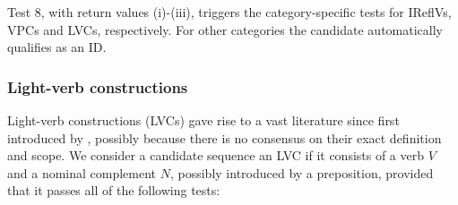 \documentclass[output=paper,
modfonts,
]{langscibook}
\begin{document}


Test 8, with return values (i)-(iii), triggers the category-specific tests for IReflVs, VPCs and LVCs, respectively. For other categories the candidate automatically qualifies as an ID.

\subsubsection{Light-verb constructions}
\label{sec:lvcs}
%
Light-verb constructions (LVCs) gave rise to a vast literature since first introduced by \citet{jespersen:65}, possibly because there is no consensus on their exact definition and scope. 
%
We consider a candidate sequence an LVC if it consists of a verb $V$ and a nominal complement $N$, possibly introduced by a preposition, provided that it passes all of the following tests:
\end{document}
